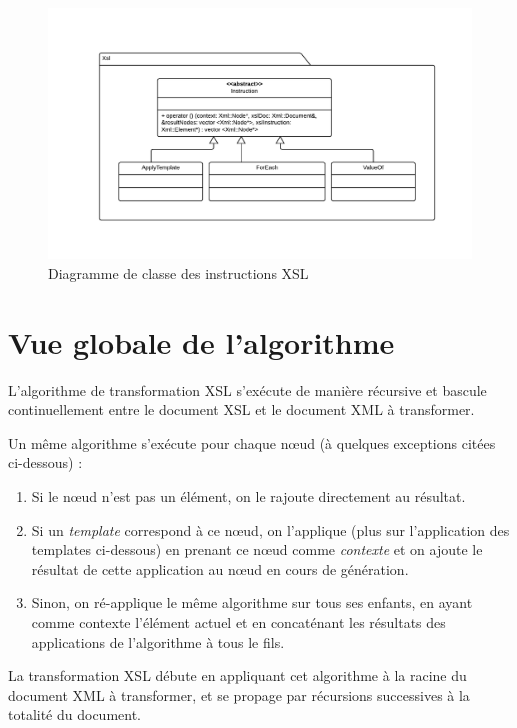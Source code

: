 \begin{landscape}
\begin{figure}[h!]
    \centering
    \includegraphics[width=\linewidth]{images/xsl-uml.pdf}
    \caption{Diagramme de classe des instructions XSL}
    \label{xslClassDiagram}
\end{figure}
\end{landscape}


\section{Vue globale de l'algorithme}

L'algorithme de transformation XSL s’exécute de manière récursive et bascule continuellement entre le document XSL et le document XML à transformer.

Un même algorithme s'exécute pour chaque nœud (à quelques exceptions citées ci-dessous) :

\begin{enumerate}
    \item Si le nœud n'est pas un élément, on le rajoute directement au résultat.
    \item Si un \textit{template} correspond à ce nœud, on l'applique (plus sur l'application des templates ci-dessous) en prenant ce nœud comme \textit{contexte} et on ajoute le résultat de cette application au nœud en cours de génération.
    \item Sinon, on ré-applique le même algorithme sur tous ses enfants, en ayant comme contexte l'élément actuel et en concaténant les résultats des applications de l'algorithme à tous le fils.
\end{enumerate}

La transformation XSL débute en appliquant cet algorithme à la racine du document XML à transformer, et se propage par récursions successives
à la totalité du document.

